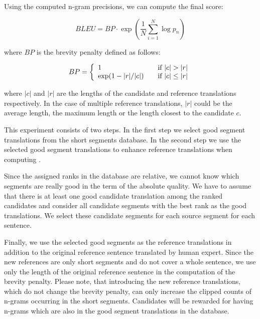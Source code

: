 \noindent Using the computed n-gram precisions, we can compute the final
 score:

\begin{equation*}
        BLEU = BP \cdot \exp \left( \frac{1}{N} \sum_{i = 1}^N \log p_n \right) 
\end{equation*}

\noindent
where $BP$ is the brevity penalty defined as follows:

\begin{equation*}
    BP = \left\{ 
  \begin{array}{l l}
    1 & \quad \text{if } |c| > |r|\\
    \exp(1-|r|/|c|) & \quad \text{if } |c| \leq |r| \\
    \end{array} \right.
\end{equation*}

\noindent where $|c|$ and $|r|$ are the lengths of the candidate and reference
translations respectively. In the case of multiple reference translations,
$|r|$ could be the average length, the maximum length or the length closest to
the candidate $c$.

This experiment consists of two steps. In the first step we select good segment
translations from the short segments database. In the second step we use the
selected good segment translations to enhance reference translations when
computing .

Since the assigned ranks in the database are relative, we cannot know which
segments are really good in the term of the absolute quality. We have to assume
that there is at least one good candidate translation among the ranked
candidates and consider all candidate segments with the best rank as the good
translations. We select these candidate segments for each source segment for
each sentence.

Finally, we use the selected good segments as the reference translations in
addition to the original reference sentence translated by human expert.  Since
the new references are only short segments and do not cover a whole sentence,
we use only the length of the original reference sentence in the computation of
the brevity penalty. Please note, that introducing the new reference
translations, which do not change the brevity penalty, can only increase the
clipped counts of n-grams occurring in the short segments.  Candidates will be
rewarded for having n-grams which are also in the good segment translations in
the database.

